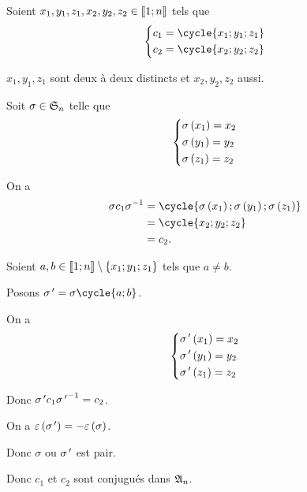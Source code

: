 \begin{corr}[5]
Soient \(x_1,y_1,z_1,x_2,y_2,z_2\in\interventierii{1}{n}\) tels que \[\begin{dcases}c_1=\cycle{x_1;y_1;z_1} \\ c_2=\cycle{x_2;y_2;z_2}\end{dcases}\]

\(x_1,y_1,z_1\) sont deux à deux distincts et \(x_2,y_2,z_2\) aussi.

Soit \(\sigma\in\S{n}\) telle que \[\begin{dcases}\sigma\paren{x_1}=x_2 \\ \sigma\paren{y_1}=y_2 \\ \sigma\paren{z_1}=z_2\end{dcases}\]

On a \[\begin{aligned}
\sigma c_1\sigma\inv&=\cycle{\sigma\paren{x_1};\sigma\paren{y_1};\sigma\paren{z_1}} \\
&=\cycle{x_2;y_2;z_2} \\
&=c_2.
\end{aligned}\]

Soient \(a,b\in\interventierii{1}{n}\excluant\accol{x_1;y_1;z_1}\) tels que \(a\not=b\).

Posons \(\sigma\prim=\sigma\cycle{a;b}\).

On a \[\begin{dcases}
\sigma\prim\paren{x_1}=x_2 \\
\sigma\prim\paren{y_1}=y_2 \\
\sigma\prim\paren{z_1}=z_2
\end{dcases}\]

Donc \(\sigma\prim c_1{\sigma\prim}\inv=c_2\).

On a \(\epsilon\paren{\sigma\prim}=-\epsilon\paren{\sigma}\).

Donc \(\sigma\) ou \(\sigma\prim\) est pair.

Donc \(c_1\) et \(c_2\) sont conjugués dans \(\frakA{n}\).
\end{corr}

